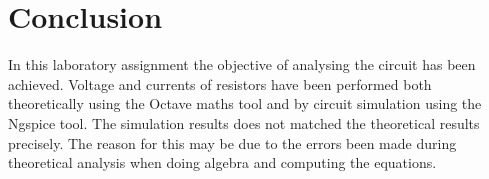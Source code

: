 \section{Conclusion}
\label{sec:conclusion}

In this laboratory assignment the objective of analysing the circuit has been
achieved. Voltage and currents of resistors have been performed both
theoretically using the Octave maths tool and by circuit simulation using the
Ngspice tool. The simulation results does not matched the theoretical results
precisely. The reason for this may be due to the errors been made during theoretical analysis when doing algebra and computing the equations.

\lipsum[1-1]
